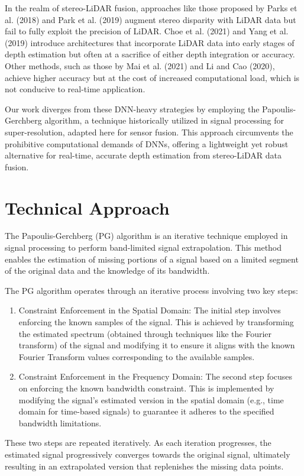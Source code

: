 \documentclass[conference]{IEEEtran}
\begin{document}
In the realm of stereo-LiDAR fusion, approaches like those proposed by Parks et al. (2018) and Park et al. (2019) augment stereo disparity with LiDAR data but fail to fully exploit the precision of LiDAR. Choe et al. (2021) and Yang et al. (2019) introduce architectures that incorporate LiDAR data into early stages of depth estimation but often at a sacrifice of either depth integration or accuracy. Other methods, such as those by Mai et al. (2021) and Li and Cao (2020), achieve higher accuracy but at the cost of increased computational load, which is not conducive to real-time application.

Our work diverges from these DNN-heavy strategies by employing the Papoulis-Gerchberg algorithm, a technique historically utilized in signal processing for super-resolution, adapted here for sensor fusion. This approach circumvents the prohibitive computational demands of DNNs, offering a lightweight yet robust alternative for real-time, accurate depth estimation from stereo-LiDAR data fusion.

\section{Technical Approach}

The Papoulis-Gerchberg (PG) algorithm is an iterative technique employed in signal processing to perform band-limited signal extrapolation. This method enables the estimation of missing portions of a signal based on a limited segment of the original data and the knowledge of its bandwidth.

The PG algorithm operates through an iterative process involving two key steps:

\begin{enumerate}
    \item Constraint Enforcement in the Spatial Domain:
    The initial step involves enforcing the known samples of the signal. This is achieved by transforming the estimated spectrum (obtained through techniques like the Fourier transform) of the signal and modifying it to ensure it aligns with the known Fourier Transform values corresponding to the available samples.
    
    \item Constraint Enforcement in the Frequency Domain:
    The second step focuses on enforcing the known bandwidth constraint. This is implemented by modifying the signal's estimated version in the spatial domain (e.g., time domain for time-based signals) to guarantee it adheres to the specified bandwidth limitations.
\end{enumerate}
These two steps are repeated iteratively. As each iteration progresses, the estimated signal progressively converges towards the original signal, ultimately resulting in an extrapolated version that replenishes the missing data points.
\end{document}
